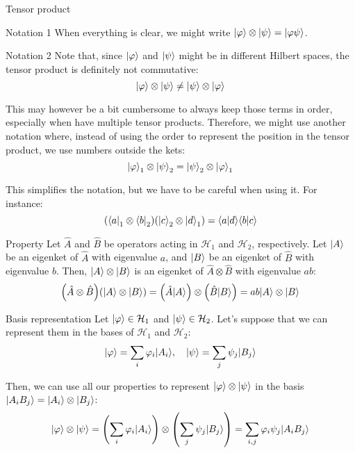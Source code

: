 \documentclass[a4paper]{article}
\begin{document}
\begin{parag}{Tensor product}
    \begin{subparag}{Notation 1}
        When everything is clear, we might write $\ket{\phi} \otimes \ket{\psi} = \ket{\phi \psi}$. 
    \end{subparag}

    \begin{subparag}{Notation 2}
        Note that, since $\ket{\phi}$ and $\ket{\psi}$ might be in different Hilbert spaces, the tensor product is definitely not commutative: 
        \[\ket{\phi} \otimes \ket{\psi} \neq \ket{\psi} \otimes \ket{\phi}\]

        This may however be a bit cumbersome to always keep those terms in order, especially when have multiple tensor products. Therefore, we might use another notation where, instead of using the order to represent the position in the tensor product, we use numbers outside the kets: 
        \[\ket{\phi}_1 \otimes \ket{\psi}_2 = \ket{\psi}_2 \otimes \ket{\phi}_1\]

        This simplifies the notation, but we have to be careful when using it. For instance: 
        \[\left(\bra{a}_1 \otimes \bra{b}_2\right) \left(\ket{c}_2 \otimes \ket{d}_1\right) = \braket{a}{d} \braket{b}{c}\]
    \end{subparag}

    \begin{subparag}{Property}
        Let $\hat{A}$ and $\hat{B}$ be operators acting in $\mathcal{H}_1$ and $\mathcal{H}_2$, respectively. Let $\ket{A}$ be an eigenket of $\hat{A}$ with eigenvalue $a$, and $\ket{B}$ be an eigenket of $\hat{B}$ with eigenvalue $b$. Then, $\ket{A} \otimes \ket{B}$ is an eigenket of $\hat{A} \otimes \hat{B}$ with eigenvalue $ab$: 
        \[\left(\hat{A} \otimes \hat{B}\right) \left(\ket{A} \otimes \ket{B}\right) = \left(\hat{A} \ket{A}\right) \otimes \left(\hat{B} \ket{B}\right) = ab \ket{A} \otimes \ket{B}\]
    \end{subparag}
    
    \begin{subparag}{Basis representation}
        Let $\ket{\phi} \in \mathcal{H}_1$ and $\ket{\psi} \in \mathcal{H}_2$. Let's suppose that we can represent them in the bases of $\mathcal{H}_1$ and $\mathcal{H}_2$: 
        \[\ket{\phi} = \sum_{i} \phi_i \ket{A_i}, \mathspace \ket{\psi} = \sum_{j} \psi_j \ket{B_j}\]
        
        Then, we can use all our properties to represent $\ket{\phi} \otimes \ket{\psi}$ in the basis $\ket{A_i B_j} = \ket{A_i} \otimes \ket{B_j}$: 
        \[\ket{\phi} \otimes \ket{\psi} = \left(\sum_{i} \phi_i \ket{A_i}\right) \otimes \left(\sum_{j} \psi_j \ket{B_j}\right) = \sum_{i, j} \phi_i \psi_j \ket{A_i B_j}\]


\end{subparag}
\end{parag}
\end{document}
